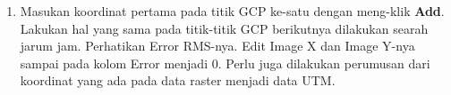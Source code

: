 \begin{enumerate}[1.]
  \item Masukan koordinat pertama pada titik GCP ke-satu dengan meng-klik \textbf{Add}. Lakukan hal yang sama pada titik-titik GCP berikutnya dilakukan searah jarum jam. Perhatikan Error RMS-nya. Edit Image X dan Image Y-nya sampai pada kolom Error menjadi 0. Perlu juga dilakukan perumusan dari koordinat yang ada pada data raster menjadi data UTM.
\end{enumerate}

